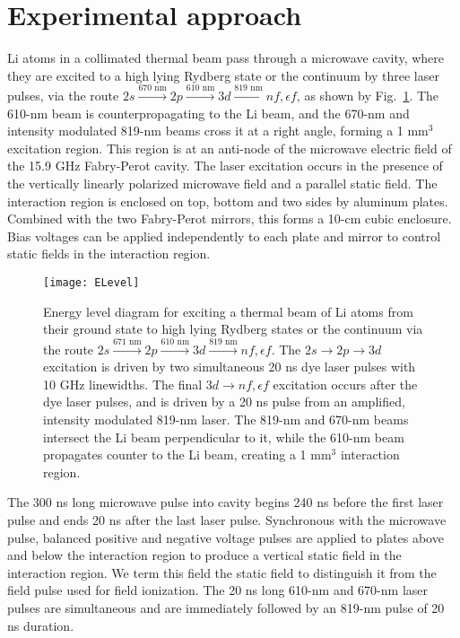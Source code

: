 \documentclass[aps,pra,reprint,groupedaddress]{revtex4-1}
\begin{document}
\section{\label{sec:exp} Experimental approach}

Li atoms in a collimated thermal beam pass through a microwave cavity, where they are excited to a high lying Rydberg state or the continuum by three laser pulses, via the route $2s \xrightarrow{\text{670 nm}} 2p \xrightarrow{\text{610 nm}} 3d \xrightarrow{\text{819 nm}} nf, \epsilon f$, as shown by Fig.~\ref{fig:ELev}. The 610-nm beam is counterpropagating to the Li beam, and the 670-nm and intensity modulated 819-nm beams cross it at a right angle, forming a 1 mm$^3$ excitation region. This region is at an anti-node of the microwave electric field of the 15.9 GHz Fabry-Perot cavity. The laser excitation occurs in the presence of the vertically linearly polarized microwave field and a parallel static field. The interaction region is enclosed on top, bottom and two sides by aluminum plates. Combined with the two Fabry-Perot mirrors, this forms a 10-cm cubic enclosure. Bias voltages can be applied independently to each plate and mirror to control static fields in the interaction region.

\begin{figure}
	\texttt{[image: ELevel]}
	\caption{Energy level diagram for exciting a thermal beam of Li atoms from their ground state to high lying Rydberg states or the continuum via the route $2s \xrightarrow{\text{671 nm}} 2p \xrightarrow{\text{610 nm}} 3d \xrightarrow{\text{819 nm}} nf, \epsilon f$. The $2s \rightarrow 2p \rightarrow 3d$ excitation is driven by two simultaneous 20 ns dye laser pulses with 10 GHz linewidths. The final $3d \rightarrow nf, \epsilon f$ excitation occurs after the dye laser pulses, and is driven by a 20 ns pulse from an amplified, intensity modulated 819-nm laser. The 819-nm and 670-nm beams intersect the Li beam perpendicular to it, while the 610-nm beam propagates counter to the Li beam, creating a 1 mm$^3$ interaction region.}
	\label{fig:ELev}
\end{figure}

The 300 ns long microwave pulse into cavity begins 240 ns before the first laser pulse and ends 20 ns after the last laser pulse. Synchronous with the microwave pulse, balanced positive and negative voltage pulses are applied to plates above and below the interaction region to produce a vertical static field in the interaction region. We term this field the static field to distinguish it from the field pulse used for field ionization. The 20 ns long 610-nm and 670-nm laser pulses are simultaneous and are immediately followed by an 819-nm pulse of 20 ns duration.
\end{document}

